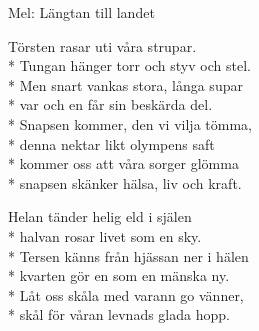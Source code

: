 \begin{SongText}
    \begin{SongInfo}
        Mel: Längtan till landet
    \end{SongInfo}
    \begin{SongVerse}
        Törsten rasar uti våra strupar.\\*%
        Tungan hänger torr och styv och stel.\\*%
        Men snart vankas stora, långa supar\\*%
        var och en får sin beskärda del.\\*%
        Snapsen kommer, den vi vilja tömma,\\*%
        denna nektar likt olympens saft\\*%
        kommer oss att våra sorger glömma\\*%
        snapsen skänker hälsa, liv och kraft.
    \end{SongVerse}
    \begin{SongVerse}
        Helan tänder helig eld i själen\\*%
        halvan rosar livet som en sky.\\*%
        Tersen känns från hjässan ner i hälen\\*%
        kvarten gör en som en mänska ny.\\*%
        Låt oss skåla med varann go vänner,\\*%
        skål för våran levnads glada hopp.
    \end{SongVerse}
\end{SongText}
